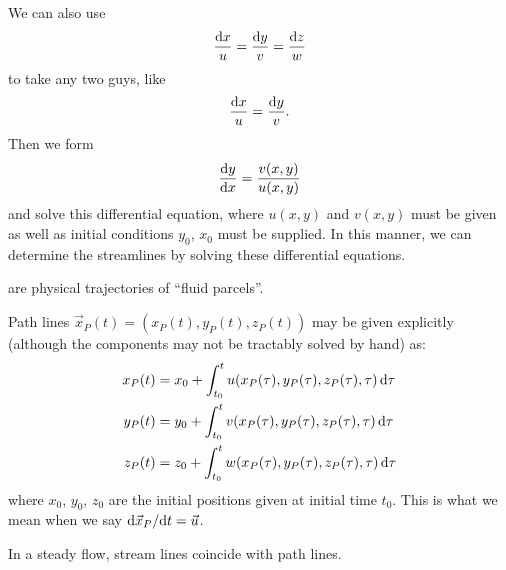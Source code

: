\begin{node}
We can also use
\begin{equation}
\frac{\mathrm{d} x}{u}=\frac{\mathrm{d} y}{v}=\frac{\mathrm{d} z}{w}
\end{equation}
to take any two guys, like
\begin{equation}
\frac{\mathrm{d} x}{u}=\frac{\mathrm{d} y}{v}.
\end{equation}
Then we form
\begin{equation}
\frac{\mathrm{d} y}{\mathrm{d} x}=\frac{v(x,y)}{u(x,y)}
\end{equation}
and solve this differential equation, where $u(x,y)$ and $v(x,y)$ must
be given as well as initial conditions $y_{0}$, $x_{0}$ must be
supplied. In this manner, we can determine the streamlines by solving
these differential equations. 
\end{node}

\begin{definition}
 are physical trajectories of ``fluid parcels''.
\end{definition}

\begin{node}
Path lines $\vec{x}_{P}(t)=(x_{P}(t),y_{P}(t),z_{P}(t))$ may be given
explicitly (although the components may not be tractably solved by hand) as:
\begin{subequations}
  \begin{align}
x_{P}(t) &= x_{0} + \int^{t}_{t_{0}}u(x_{P}(\tau),y_{P}(\tau),z_{P}(\tau),\tau)\,\mathrm{d}\tau\\
y_{P}(t) &= y_{0} + \int^{t}_{t_{0}}v(x_{P}(\tau),y_{P}(\tau),z_{P}(\tau),\tau)\,\mathrm{d}\tau\\
z_{P}(t) &= z_{0} + \int^{t}_{t_{0}}w(x_{P}(\tau),y_{P}(\tau),z_{P}(\tau),\tau)\,\mathrm{d}\tau
  \end{align}
\end{subequations}
where $x_{0}$, $y_{0}$, $z_{0}$ are the initial positions given at
initial time $t_{0}$. This is what we mean when we say
$\mathrm{d}\vec{x}_{P}/\mathrm{d} t=\vec{u}$.
\end{node}

\begin{fact}
In a steady flow, stream lines coincide with path lines.
\end{fact}

